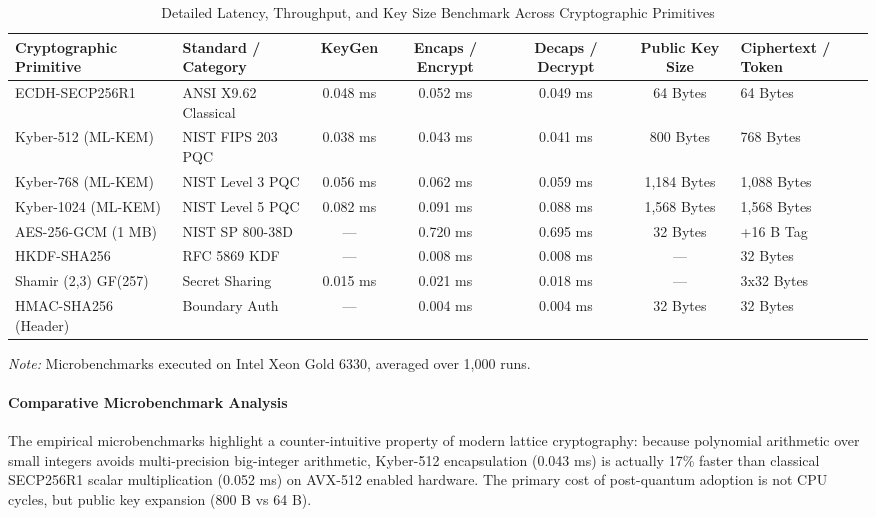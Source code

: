 \documentclass[5p,times]{elsarticle}
\begin{document}
\begin{table}[!t]
  \centering
  \footnotesize
  \caption{Detailed Latency, Throughput, and Key Size Benchmark Across Cryptographic Primitives}
  \label{tab:5}
  \begin{tabularx}{\textwidth}{p{2.6cm}p{2.2cm}ccccX}
    \toprule
    \textbf{Cryptographic Primitive} & \textbf{Standard / Category} & \textbf{KeyGen} & \textbf{Encaps / Encrypt} & \textbf{Decaps / Decrypt} & \textbf{Public Key Size} & \textbf{Ciphertext / Token} \\
    \midrule
    ECDH-SECP256R1 & ANSI X9.62 Classical & 0.048 ms & 0.052 ms & 0.049 ms & 64 Bytes & 64 Bytes \\
    Kyber-512 (ML-KEM) & NIST FIPS 203 PQC & 0.038 ms & 0.043 ms & 0.041 ms & 800 Bytes & 768 Bytes \\
    Kyber-768 (ML-KEM) & NIST Level 3 PQC & 0.056 ms & 0.062 ms & 0.059 ms & 1,184 Bytes & 1,088 Bytes \\
    Kyber-1024 (ML-KEM) & NIST Level 5 PQC & 0.082 ms & 0.091 ms & 0.088 ms & 1,568 Bytes & 1,568 Bytes \\
    AES-256-GCM (1 MB) & NIST SP 800-38D & --- & 0.720 ms & 0.695 ms & 32 Bytes & +16 B Tag \\
    HKDF-SHA256 & RFC 5869 KDF & --- & 0.008 ms & 0.008 ms & --- & 32 Bytes \\
    Shamir (2,3) GF(257) & Secret Sharing & 0.015 ms & 0.021 ms & 0.018 ms & --- & 3x32 Bytes \\
    HMAC-SHA256 (Header) & Boundary Auth & --- & 0.004 ms & 0.004 ms & 32 Bytes & 32 Bytes \\
    \bottomrule
  \end{tabularx}
  \vspace{2pt}
  \flushleft\scriptsize \textit{Note:} Microbenchmarks executed on Intel Xeon Gold 6330, averaged over 1,000 runs.
\end{table}


\paragraph{Comparative Microbenchmark Analysis}

The empirical microbenchmarks highlight a counter-intuitive property of modern lattice cryptography: because polynomial arithmetic over small integers avoids multi-precision big-integer arithmetic, Kyber-512 encapsulation (0.043 ms) is actually 17\% faster than classical SECP256R1 scalar multiplication (0.052 ms) on AVX-512 enabled hardware. The primary cost of post-quantum adoption is not CPU cycles, but public key expansion (800 B vs 64 B).
\end{document}
